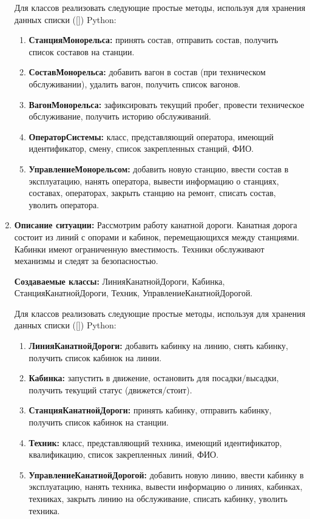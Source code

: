 \begin{enumerate}
Для классов реализовать следующие простые методы, используя для хранения данных списки ([]) Python:
\begin{enumerate}
\item \textbf{СтанцияМонорельса:} принять состав, отправить состав, 
получить список составов на станции.
\item \textbf{СоставМонорельса:} добавить вагон в состав (при техническом обслуживании), 
удалить вагон, получить список вагонов.
\item \textbf{ВагонМонорельса:} зафиксировать текущий пробег, 
провести техническое обслуживание, получить историю обслуживаний.
\item \textbf{ОператорСистемы:} класс, представляющий оператора, 
имеющий идентификатор, смену, список закрепленных станций, ФИО.
\item \textbf{УправлениеМонорельсом:} добавить новую станцию, ввести состав в эксплуатацию, 
нанять оператора, вывести информацию о станциях, составах, операторах, закрыть станцию на ремонт, 
списать состав, уволить оператора.
\end{enumerate}

\item
\textbf{Описание ситуации:}
Рассмотрим работу канатной дороги. Канатная дорога состоит из линий с опорами и кабинок, 
перемещающихся между станциями. 
Кабинки имеют ограниченную вместимость. Техники обслуживают механизмы и следят за безопасностью.

\textbf{Создаваемые классы:} ЛинияКанатнойДороги, Кабинка, СтанцияКанатнойДороги, Техник, УправлениеКанатнойДорогой.

Для классов реализовать следующие простые методы, используя для хранения данных списки ([]) Python:
\begin{enumerate}
\item \textbf{ЛинияКанатнойДороги:} добавить кабинку на линию, снять кабинку, 
получить список кабинок на линии.
\item \textbf{Кабинка:} запустить в движение, остановить для посадки/высадки, 
получить текущий статус (движется/стоит).
\item \textbf{СтанцияКанатнойДороги:} принять кабинку, отправить кабинку, 
получить список кабинок на станции.
\item \textbf{Техник:} класс, представляющий техника, имеющий идентификатор, 
квалификацию, список закрепленных линий, ФИО.
\item \textbf{УправлениеКанатнойДорогой:} добавить новую линию, 
ввести кабинку в эксплуатацию, нанять техника, вывести информацию о линиях, кабинках, техниках, 
закрыть линию на обслуживание, списать кабинку, уволить техника.
\end{enumerate}


\end{enumerate}

